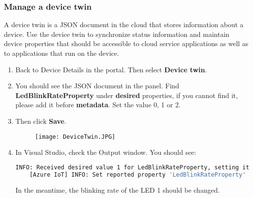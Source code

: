 \subsubsection{Manage a device twin}
A device twin is a JSON document in the cloud that stores information about a device. Use the device twin to synchronize status information and maintain device properties that should be accessible to cloud service applications as well as to applications that run on the device.
\begin{enumerate}
    \item Back to Device Details in the portal. Then select \textbf{Device twin}.
    \item You should see the JSON document in the panel. Find \textbf{LedBlinkRateProperty} under \textbf{desired} properties, if you cannot find it, please add it before \textbf{metadata}. Set the value 0, 1 or 2.
    \item Then click \textbf{Save}.
    \begin{figure}[h]
        \centering
        \texttt{[image: DeviceTwin.JPG]}
    \end{figure}
    \item In Visual Studio, check the Output window. You should see:
    \begin{lstlisting}[language=bash]
    INFO: Received desired value 1 for LedBlinkRateProperty, setting it to 1.
    [Azure IoT] INFO: Set reported property 'LedBlinkRateProperty' to value 1.
    \end{lstlisting}
    In the meantime, the blinking rate of the LED 1 should be changed.
\end{enumerate}